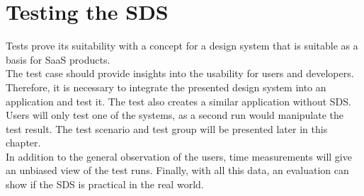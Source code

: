 \newpage
\section{Testing the \acf{SDS}}
Tests prove its suitability with a concept for a design system that is suitable as a basis for \ac{SaaS} products.\\
The test case should provide insights into the usability for users and developers. Therefore, it is necessary to integrate the presented design system into an application and test it. The test also creates a similar application without \ac{SDS}. Users will only test one of the systems, as a second run would manipulate the test result. The test scenario and test group will be presented later in this chapter. \\
In addition to the general observation of the users, time measurements will give an unbiased view of the test runs. Finally, with all this data, an evaluation can show if the \ac{SDS} is practical in the real world. 


% 